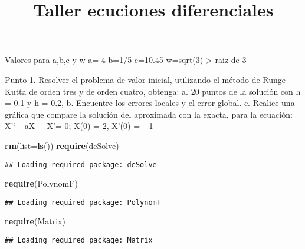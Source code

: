 \documentclass[]{article}
\title{Taller ecuciones diferenciales}
\author{}
\date{}
\newenvironment{Shaded}{\begin{snugshade}}{\end{snugshade}}
\newcommand{\KeywordTok}[1]{\textcolor[rgb]{0.13,0.29,0.53}{\textbf{#1}}}
\newcommand{\DataTypeTok}[1]{\textcolor[rgb]{0.13,0.29,0.53}{#1}}
\newcommand{\NormalTok}[1]{#1}
\begin{document}
\maketitle

Valores para a,b,c y w a=-4 b=1/5 c=10.45 w=sqrt(3)-\textgreater{} raiz
de 3

Punto 1. Resolver el problema de valor inicial, utilizando el método de
Runge-Kutta de orden tres y de orden cuatro, obtenga: a. 20 puntos de la
solución con h = 0.1 y h = 0.2, b. Encuentre los errores locales y el
error global. c. Realice una gráfica que compare la solución del
aproximada con la exacta, para la ecuación: X'`− aX − X'= 0; X(0) = 2,
X'(0) = −1

\begin{Shaded}
\begin{Highlighting}[]
\KeywordTok{rm}\NormalTok{(}\DataTypeTok{list=}\KeywordTok{ls}\NormalTok{())}
\KeywordTok{require}\NormalTok{(deSolve)}
\end{Highlighting}
\end{Shaded}

\begin{verbatim}
## Loading required package: deSolve
\end{verbatim}

\begin{Shaded}
\begin{Highlighting}[]
\KeywordTok{require}\NormalTok{(PolynomF)}
\end{Highlighting}
\end{Shaded}

\begin{verbatim}
## Loading required package: PolynomF
\end{verbatim}

\begin{Shaded}
\begin{Highlighting}[]
\KeywordTok{require}\NormalTok{(Matrix)}
\end{Highlighting}
\end{Shaded}

\begin{verbatim}
## Loading required package: Matrix
\end{verbatim}
\end{document}
